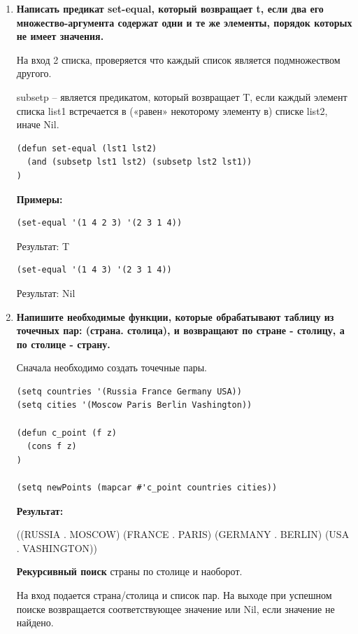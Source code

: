 \documentclass[a4paper,14pt]{extreport} %
\begin{document}
\begin{enumerate}
\item \textbf{Написать предикат set-equal, который возвращает t, если два его множество-аргумента содержат одни и те же элементы, порядок которых не имеет значения.}

На вход 2 списка, проверяется что каждый список является подмножеством другого. 

subsetp -- является предикатом, который возвращает T, если каждый элемент списка list1 встречается в («равен» некоторому элементу в) списке list2, иначе Nil.

\begin{lstlisting}
(defun set-equal (lst1 lst2)
  (and (subsetp lst1 lst2) (subsetp lst2 lst1)) 
)
\end{lstlisting}

\textbf{Примеры:}

\begin{lstlisting}
(set-equal '(1 4 2 3) '(2 3 1 4))  
\end{lstlisting}

Результат: T

\begin{lstlisting}
(set-equal '(1 4 3) '(2 3 1 4))  
\end{lstlisting}

Результат: Nil

\item \textbf{Напишите необходимые функции, которые обрабатывают таблицу из точечных пар:
(страна. столица), и возвращают по стране - столицу, а по столице - страну.}

Сначала необходимо создать точечные пары. 

\begin{lstlisting}
(setq countries '(Russia France Germany USA))
(setq cities '(Moscow Paris Berlin Vashington))

(defun c_point (f z)
  (cons f z) 
)

(setq newPoints (mapcar #'c_point countries cities))
\end{lstlisting}

\textbf{Результат: }

((RUSSIA . MOSCOW) (FRANCE . PARIS) (GERMANY . BERLIN) (USA . VASHINGTON))

\textbf{Рекурсивный поиск} страны по столице и наоборот. 

На вход подается страна/столица и список пар. На выходе при успешном поиске возвращается соответствующее значение или Nil, если значение не найдено. 


\end{enumerate}
\end{document}
